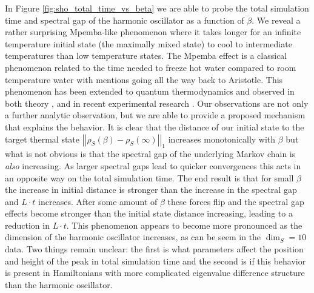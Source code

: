 \documentclass{article}
\newcommand{\norm}[1]{\left|\left| #1 \right|\right|}
\begin{document}
In Figure \ref{fig:sho_total_time_vs_beta} we are able to probe the total simulation time and spectral gap of the harmonic oscillator as a function of $\beta$. We reveal a rather surprising Mpemba-like phenomenon where it takes longer for an infinite temperature initial state (the maximally mixed state) to cool to intermediate temperatures than low temperature states. The Mpemba effect \cite{mpemba} is a classical phenomenon related to the time needed to freeze hot water compared to room temperature water with mentions going all the way back to Aristotle. This phenomenon has been extended to quantum thermodynamics and observed in both theory \cite{nickMpemba}, \cite{mpembaExplanation} and in recent experimental research \cite{zhang2025mpembaObservation}. Our observations are not only a further analytic observation, but we are able to provide a proposed mechanism that explains the behavior. It is clear that the distance of our initial state to the target thermal state $\norm{\rho_S(\beta) - \rho_S(\infty)}_1$ increases monotonically with $\beta$ but what is not obvious is that the spectral gap of the underlying Markov chain is \emph{also} increasing. As larger spectral gaps lead to quicker convergences this acts in an opposite way on the total simulation time. The end result is that for small $\beta$ the increase in initial distance is stronger than the increase in the spectral gap and $L \cdot t$ increases. After some amount of $\beta$ these forces flip and the spectral gap effects become stronger than the initial state distance increasing, leading to a reduction in $L \cdot t$. This phenomenon appears to become more pronounced as the dimension of the harmonic oscillator increases, as can be seem in the $\dim_S = 10$ data. Two things remain unclear: the first is what parameters affect the position and height of the peak in total simulation time and the second is if this behavior is present in Hamiltonians with more complicated eigenvalue difference structure than the harmonic oscillator.
\end{document}
